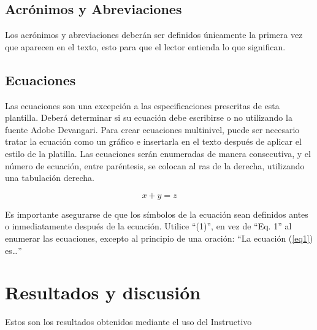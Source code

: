     \subsection{Acrónimos y Abreviaciones}
    
    Los acrónimos y abreviaciones deberán ser definidos únicamente la primera vez que aparecen en el texto, esto para que el lector entienda lo que significan.
    
    \subsection{Ecuaciones}
    
    Las ecuaciones son una excepción a las especificaciones prescritas de esta plantilla. 
    Deberá determinar si su ecuación debe escribirse o no utilizando la fuente Adobe Devangari. 
    Para crear ecuaciones multinivel, puede ser necesario tratar la ecuación como un gráfico e insertarla en el texto después de aplicar el estilo de la platilla.
    Las ecuaciones serán enumeradas de manera consecutiva, y el número de ecuación, entre paréntesis, se colocan al ras de la derecha, utilizando una tabulación derecha. 
    
    \begin{equation}
        \label{eq1}
        x + y = z 
    \end{equation}
    
    Es importante asegurarse de que los símbolos de la ecuación sean definidos antes o inmediatamente después de la ecuación. Utilice “(1)”, en vez de “Eq. 1” al enumerar las ecuaciones, excepto al principio de una oración: “La ecuación (\ref{eq1}) es…”
    
    \section{Resultados y discusión}
    
    Estos son los resultados obtenidos mediante el uso del Instructivo
    \newpage
    \label{anexo:evidencias}
    
    
    
